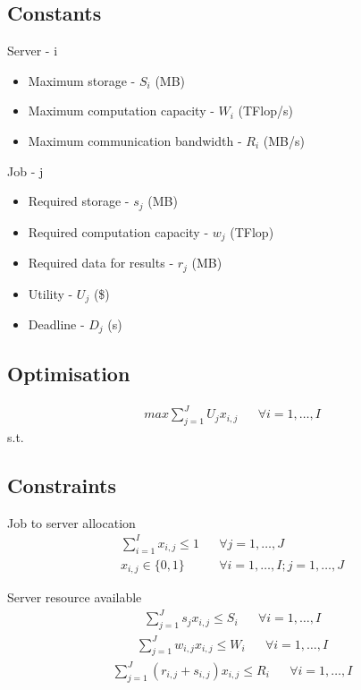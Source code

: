 \documentclass[fleqn]{article}
\begin{document}
\subsection{Constants}\label{subsec:constants}
Server - i
\begin{itemize}
    \item Maximum storage - $ S_i $ (MB)
    \item Maximum computation capacity - $ W_i $ (TFlop/s)
    \item Maximum communication bandwidth - $ R_i $ (MB/s)
\end{itemize}
Job - j
\begin{itemize}
    \item Required storage - $ s_j $ (MB)
    \item Required computation capacity - $ w_j $ (TFlop)
    \item Required data for results - $ r_j $ (MB)
    \item Utility - $ U_j $ (\$)
    \item Deadline - $ D_j $ (s)
\end{itemize}

\subsection{Optimisation}\label{subsec:optimisation}
\begin{align}
    max \sum_{j=1}^{J} U_j x_{i,j} && \forall i = 1,\dots,I
\end{align}
s.t.

\subsection{Constraints}\label{subsec:constraints}
Job to server allocation
\begin{align}
    \sum_{i=1}^I x_{i,j} \leq 1 && \forall j = 1,\dots,J \\
    x_{i,j} \in \{0, 1\} && \forall i = 1,\dots,I; j = 1,\dots,J
\end{align}

Server resource available
\begin{align}
    \sum_{j=1}^J s_j x_{i,j} \leq S_i && \forall i = 1,\dots,I
\end{align}
\begin{align}
    \sum_{j=1}^J w_{i,j} x_{i,j} \leq W_i && \forall i = 1,\dots,I
\end{align}
\begin{align}
    \sum_{j=1}^J (r_{i,j} + s_{i,j}) x_{i,j} \leq R_i && \forall i = 1,\dots,I
\end{align}
\end{document}
